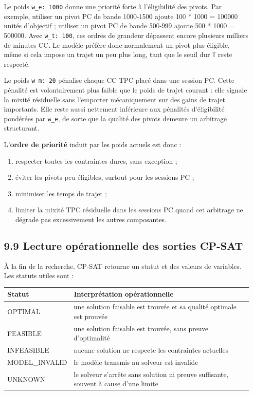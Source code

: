 \documentclass[11pt,a4paper]{article}
\begin{document}
Le poids \texttt{w\_e: 1000} donne une priorité forte à l'éligibilité des pivots. Par exemple, utiliser un pivot PC de bande 1000-1500 ajoute 100 * 1000 = 100000 unités d'objectif ; utiliser un pivot PC de bande 500-999 ajoute 500 * 1000 = 500000. Avec \texttt{w\_t: 100}, ces ordres de grandeur dépassent encore plusieurs milliers de minutes-CC. Le modèle préfère donc normalement un pivot plus éligible, même si cela impose un trajet un peu plus long, tant que le seuil dur \texttt{T} reste respecté.

Le poids \texttt{w\_m: 20} pénalise chaque CC TPC placé dans une session PC. Cette pénalité est volontairement plus faible que le poids de trajet courant : elle signale la mixité résiduelle sans l'emporter mécaniquement sur des gains de trajet importants. Elle reste aussi nettement inférieure aux pénalités d'éligibilité pondérées par \texttt{w\_e}, de sorte que la qualité des pivots demeure un arbitrage structurant.

L'\textbf{ordre de priorité} induit par les poids actuels est donc :

\begin{enumerate}
\item respecter toutes les contraintes dures, sans exception ;
\item éviter les pivots peu éligibles, surtout pour les sessions PC ;
\item minimiser les temps de trajet ;
\item limiter la mixité TPC résiduelle dans les sessions PC quand cet arbitrage ne dégrade pas excessivement les autres composantes.

\end{enumerate}

\subsection{9.9 Lecture opérationnelle des sorties CP-SAT}

À la fin de la recherche, CP-SAT retourne un statut et des valeurs de variables. Les statuts utiles sont :

\begin{longtable}{|L{0.28\textwidth}|L{0.62\textwidth}|}
\hline
Statut & Interprétation opérationnelle \\
\hline
\endhead
OPTIMAL & une solution faisable est trouvée et sa qualité optimale est prouvée \\
\hline
FEASIBLE & une solution faisable est trouvée, sans preuve d'optimalité \\
\hline
INFEASIBLE & aucune solution ne respecte les contraintes actuelles \\
\hline
MODEL\_INVALID & le modèle transmis au solveur est invalide \\
\hline
UNKNOWN & le solveur s'arrête sans solution ni preuve suffisante, souvent à cause d'une limite \\
\hline
\end{longtable}
\end{document}
